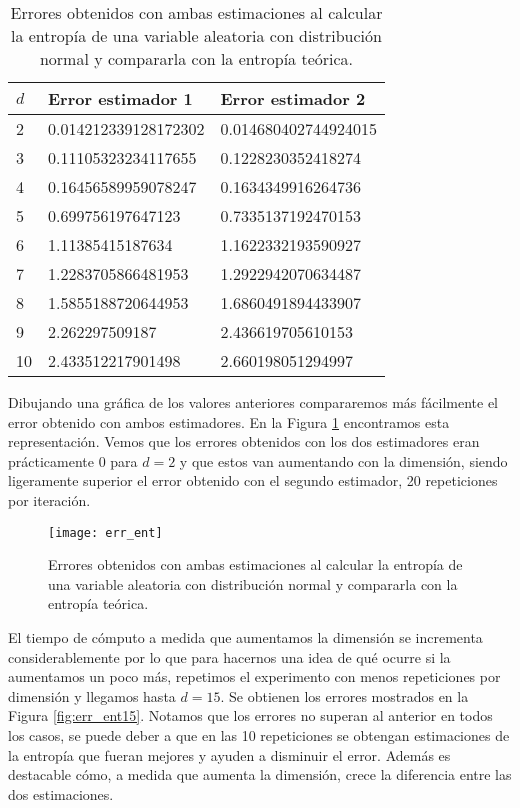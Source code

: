 \documentclass[12pt,a4paper]{report} %
\theoremstyle{definition}
\begin{document}
\begin{table}[H]
\centering
\caption{Errores obtenidos con ambas estimaciones al calcular la entropía de una variable aleatoria con distribución normal y compararla con la entropía teórica.}
\label{tab:err_ent}
\begin{tabular}{lll}
\toprule
$d$ & Error estimador 1 & Error estimador 2\\ \midrule
2 & 0.014212339128172302 & 0.014680402744924015\\
3 & 0.11105323234117655 & 0.1228230352418274\\
4 & 0.16456589959078247 & 0.1634349916264736\\
5 & 0.699756197647123 & 0.7335137192470153\\
6 & 1.11385415187634 & 1.1622332193590927\\
7 & 1.2283705866481953 & 1.2922942070634487\\
8 & 1.5855188720644953 & 1.6860491894433907\\
9 & 2.262297509187 & 2.436619705610153\\
10 & 2.433512217901498 & 2.660198051294997\\
\bottomrule
\end{tabular}
\end{table}

Dibujando una gráfica de los valores anteriores compararemos más fácilmente el error obtenido con ambos estimadores. En la Figura \ref{fig:err_ent} encontramos esta representación. Vemos que los errores obtenidos con los dos estimadores eran prácticamente $0$ para $d=2$ y que estos van aumentando con la dimensión, siendo ligeramente superior el error obtenido con el segundo estimador, 20 repeticiones por iteración.\\

\begin{figure}[H]
    \centering
    \texttt{[image: err\_ent]}
    \caption{Errores obtenidos con ambas estimaciones al calcular la entropía de una variable aleatoria con distribución normal y compararla con la entropía teórica.}
    \label{fig:err_ent}
\end{figure}

El tiempo de cómputo a medida que aumentamos la dimensión se incrementa considerablemente por lo que para hacernos una idea de qué ocurre si la aumentamos un poco más, repetimos el experimento con menos repeticiones por dimensión y llegamos hasta $d = 15$. Se obtienen los errores mostrados en la Figura \ref{fig:err_ent15}. Notamos que los errores no superan al anterior en todos los casos, se puede deber a que en las 10 repeticiones se obtengan estimaciones de la entropía que fueran mejores y ayuden a disminuir el error. Además es destacable cómo, a medida que aumenta la dimensión, crece la diferencia entre las dos estimaciones.\\
\end{document}
